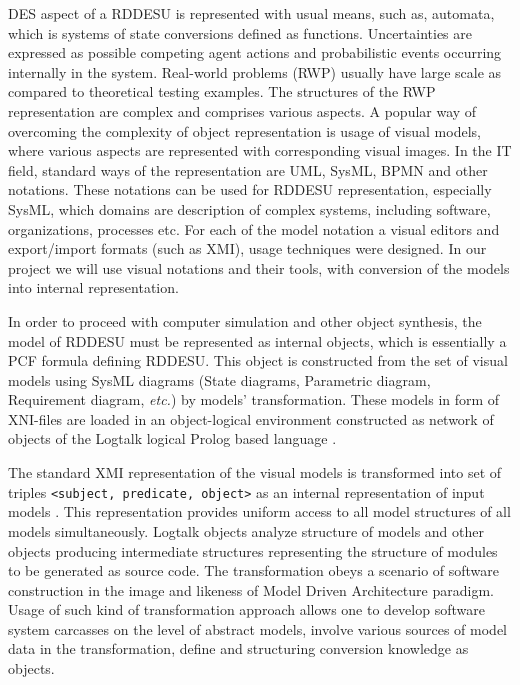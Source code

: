 \documentclass[conference]{IEEEtran}
\begin{document}
DES aspect of a RDDESU is represented with usual means, such as, automata, which is systems of state conversions defined as functions.  Uncertainties are expressed as possible competing agent actions and probabilistic events occurring internally in the system.  Real-world problems (RWP) usually have large scale as compared to theoretical testing examples. The structures of the RWP representation are complex and comprises various aspects. A popular way of overcoming the complexity of object representation is usage of visual models, where various aspects are represented with corresponding visual images. In the IT field, standard ways of the representation are UML, SysML, BPMN and other notations. These notations can be used for RDDESU representation, especially SysML, which domains are description of complex systems, including software, organizations, processes etc. For each of the model notation a visual editors and export/import formats (such as XMI), usage techniques were designed. In our project we will use visual notations and their tools, with conversion of the models into internal representation.

In order to proceed with computer simulation and other object synthesis, the model of RDDESU must be represented as internal objects, which is essentially a PCF formula defining RDDESU. This object is constructed from the set of visual models using SysML diagrams (State diagrams, Parametric diagram, Requirement diagram, \emph{etc.}) by models' transformation. These models in form of XNI-files are loaded in an object-logical environment constructed as network of objects of the Logtalk logical Prolog based language \cite{b3}. %

The standard XMI representation of the visual models is transformed into set of triples \texttt{<subject, predicate, object>} as an internal representation of input models \cite{b2}. This representation provides uniform access to all model structures of all models simultaneously. %
Logtalk objects analyze structure of models and other objects producing intermediate structures representing the structure of modules to be generated as source code. The transformation obeys a scenario of software construction in the image and likeness of Model Driven Architecture paradigm. Usage of such kind of transformation approach allows one to develop software system carcasses on the level of abstract models, involve various sources of model data in the transformation, define and structuring conversion knowledge as objects.
\end{document}
